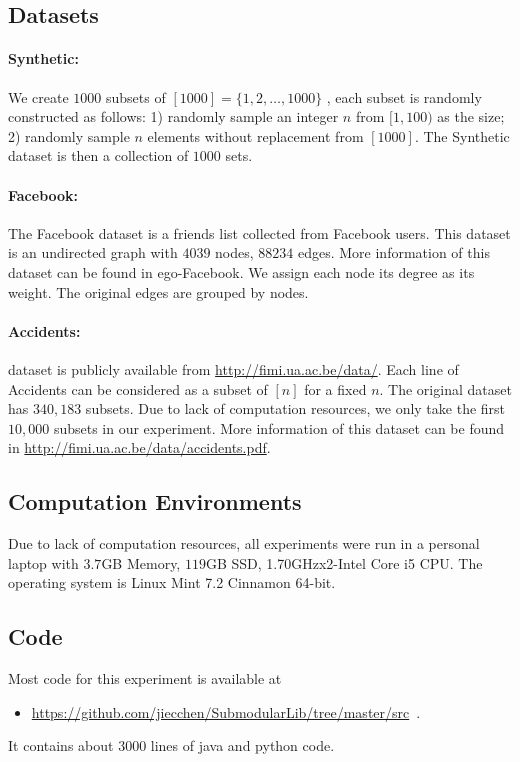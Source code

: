 \documentclass[11pt]{article}
\begin{document}
\subsection{Datasets}
\paragraph{Synthetic:} We create $1000$ subsets of $[1000] = \{1, 2, \ldots, 1000\}$ , each subset is randomly constructed as follows: 1) randomly sample an integer $n$ from $[1, 100)$ as the size; 2) randomly sample $n$ elements without replacement from $[1000]$. The {\sc Synthetic } dataset is then a collection of $1000$ sets.


\paragraph{Facebook:} 
The {\sc Facebook} dataset is a friends list collected from Facebook users. This dataset is an undirected graph with $4039$ nodes, $88234$ edges. More information of this dataset can be found in \cite{snapnets} ego-Facebook.  We assign each node its degree as its weight. The original edges are grouped by nodes.

\paragraph{Accidents:} dataset is publicly available from \url{http://fimi.ua.ac.be/data/}. Each line of {\sc Accidents} can be considered as a subset of $[n]$ for a fixed $n$. The original dataset has $340,183$ subsets. Due to lack of computation resources, we only take the first $10,000$ subsets in our experiment. More information of this dataset can be found in \url{http://fimi.ua.ac.be/data/accidents.pdf}. 

\subsection{Computation Environments}
Due to lack of computation resources, all experiments were run in a personal laptop with $3.7$GB Memory, $119$GB SSD, 1.70GHzx2-Intel Core i5 CPU. The operating system is Linux Mint 7.2 Cinnamon 64-bit. 

\subsection{Code} 
Most code for this experiment is available at 
\begin{itemize}
\item \url{https://github.com/jiecchen/SubmodularLib/tree/master/src}~.
\end{itemize}
It contains about $3000$ lines of java and python code.
\end{document}
